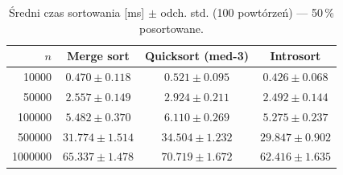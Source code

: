 \begin{table}[H]
\centering
\caption{Średni czas sortowania [ms] $\pm$ odch. std. (100 powtórzeń) — 50\,\% posortowane.}
\label{tab:summary_sorted_50}
\begin{tabular}{rccc}
\toprule
$n$ & Merge sort & Quicksort (med-3) & Introsort \\
\midrule
\num{10000} & $0.470 \pm 0.118$ & $0.521 \pm 0.095$ & $0.426 \pm 0.068$ \\
\num{50000} & $2.557 \pm 0.149$ & $2.924 \pm 0.211$ & $2.492 \pm 0.144$ \\
\num{100000} & $5.482 \pm 0.370$ & $6.110 \pm 0.269$ & $5.275 \pm 0.237$ \\
\num{500000} & $31.774 \pm 1.514$ & $34.504 \pm 1.232$ & $29.847 \pm 0.902$ \\
\num{1000000} & $65.337 \pm 1.478$ & $70.719 \pm 1.672$ & $62.416 \pm 1.635$ \\
\bottomrule
\end{tabular}
\end{table}

